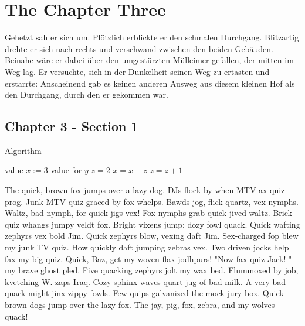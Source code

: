 
\chapter{The Chapter Three}
\label{Chapter 3}
%
Gehetzt sah er sich um. Plötzlich erblickte er den schmalen
Durchgang. Blitzartig drehte er sich nach rechts und verschwand
zwischen den beiden Gebäuden. Beinahe wäre er dabei über den
umgestürzten Mülleimer gefallen, der mitten im Weg lag. Er
versuchte, sich in der Dunkelheit seinen Weg zu ertasten und
erstarrte: Anscheinend gab es keinen anderen Ausweg aus diesem
kleinen Hof als den Durchgang, durch den er gekommen war.

\section{Chapter 3 - Section 1}
\label{Chapter_3_-_Section_1}
%
    \begin{algorithm}[t]
    \centering
    \caption[An algorithm]{Algorithm} \label{algo_1}
    \begin{algorithmic}
    \REQUIRE value $x :=3$
    \ENSURE value for $y$
    \STATE $z = 2$
    \STATE $x = x + z$
    \STATE $z = z + 1$
    \ENDFOR
    \ENDWHILE
    \end{algorithmic}
    \end{algorithm}


The quick, brown fox jumps over a lazy dog. DJs flock by when MTV ax quiz prog. Junk MTV quiz graced by fox whelps. Bawds jog, flick quartz, vex nymphs. Waltz, bad nymph, for quick jigs vex! Fox nymphs grab quick-jived waltz. Brick quiz whangs jumpy veldt fox. Bright vixens jump; dozy fowl quack. Quick wafting zephyrs vex bold Jim. Quick zephyrs blow, vexing daft Jim. Sex-charged fop blew my junk TV quiz. How quickly daft jumping zebras vex. Two driven jocks help fax my big quiz. Quick, Baz, get my woven flax jodhpurs! "Now fax quiz Jack! " my brave ghost pled. Five quacking zephyrs jolt my wax bed. Flummoxed by job, kvetching W. zaps Iraq. Cozy sphinx waves quart jug of bad milk. A very bad quack might jinx zippy fowls. Few quips galvanized the mock jury box. Quick brown dogs jump over the lazy fox. The jay, pig, fox, zebra, and my wolves quack!

